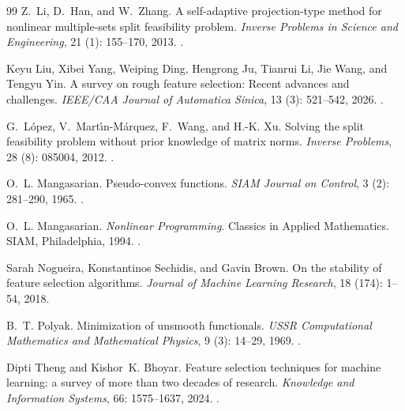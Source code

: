 \documentclass[]{interact}
\theoremstyle{plain}
\theoremstyle{definition}
\theoremstyle{remark}
\begin{document}
\begin{thebibliography}{99}
Z.~Li, D.~Han, and W.~Zhang.
\newblock A self-adaptive projection-type method for nonlinear multiple-sets split feasibility problem.
\newblock \emph{Inverse Problems in Science and Engineering}, 21 (1): 155--170, 2013.
\newblock {}.

Keyu Liu, Xibei Yang, Weiping Ding, Hengrong Ju, Tianrui Li, Jie Wang, and Tengyu Yin.
\newblock A survey on rough feature selection: Recent advances and challenges.
\newblock \emph{{IEEE}/{CAA} Journal of Automatica Sinica}, 13 (3): 521--542, 2026.
\newblock {}.

G.~L{\'o}pez, V.~Mart{\'\i}n-M{\'a}rquez, F.~Wang, and H.-K. Xu.
\newblock Solving the split feasibility problem without prior knowledge of matrix norms.
\newblock \emph{Inverse Problems}, 28 (8): 085004, 2012.
\newblock {}.

O.~L. Mangasarian.
\newblock Pseudo-convex functions.
\newblock \emph{SIAM Journal on Control}, 3 (2): 281--290, 1965.
\newblock {}.

O.~L. Mangasarian.
\newblock \emph{Nonlinear Programming}.
\newblock Classics in Applied Mathematics. SIAM, Philadelphia, 1994.
\newblock {}.

Sarah Nogueira, Konstantinos Sechidis, and Gavin Brown.
\newblock On the stability of feature selection algorithms.
\newblock \emph{Journal of Machine Learning Research}, 18 (174): 1--54, 2018.

B.~T. Polyak.
\newblock Minimization of unsmooth functionals.
\newblock \emph{USSR Computational Mathematics and Mathematical Physics}, 9 (3): 14--29, 1969.
\newblock {}.

Dipti Theng and Kishor~K. Bhoyar.
\newblock Feature selection techniques for machine learning: a survey of more than two decades of research.
\newblock \emph{Knowledge and Information Systems}, 66: 1575--1637, 2024.
\newblock {}.


\end{thebibliography}
\end{document}
